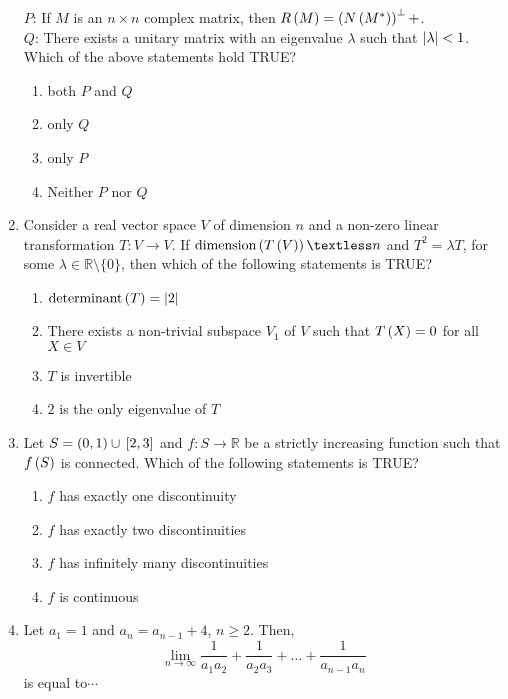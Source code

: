 \documentclass[journal,12pt,twocolumn]{IEEEtran}
\theoremstyle{remark}
\begin{document}
\begin{enumerate}[start=1]
         $P$: If $M$ is an $n \times n$ complex matrix, then $R\left(M\right) = \left(N\left(M^*\right)\right)^\perp+$.\\
        $Q$: There exists a unitary matrix with an eigenvalue $\lambda$ such that $\left\vert\lambda\right\vert < 1$.\\
    Which of the above statements hold TRUE?
    \begin{enumerate}
        \item both $P$ and $Q$
        \item only $Q$
        \item only $P$
        \item Neither $P$ nor $Q$
    \end{enumerate}

    \item Consider a real vector space $V$ of dimension $n$ and a non-zero linear transformation $T: V \to V$. If $\text{dimension}\brak{T\brak{V}} \textless n$ and $T^2 = \lambda T$, for some $\lambda \in \mathbb{R} \setminus \{0\}$, then which of the following statements is TRUE?
    \begin{enumerate}
        \item $\text{determinant}\left(T\right) = \left\vert2\right\vert$
        \item There exists a non-trivial subspace $V_1$ of $V$ such that $T\left(X\right) = 0$ for all $X \in V$
        \item $T$ is invertible
        \item $2$ is the only eigenvalue of $T$
    \end{enumerate}

    \item Let $S = \left(0,1\right) \cup {}\left[2,3\right]$ and $f: S \to \mathbb{R}$ be a strictly increasing function such that $f\left(S\right)$ is connected. Which of the following statements is TRUE?
    \begin{enumerate}
        \item $f$ has exactly one discontinuity
        \item $f$ has exactly two discontinuities
        \item $f$ has infinitely many discontinuities
        \item $f$ is continuous
    \end{enumerate}

    \item Let $a_1 = 1$ and $a_n = a_{n-1} + 4$, $n \geq 2$. Then,
    $$\lim_{n \to \infty} \frac{1}{a_1 a_2} + \frac{1}{a_2 a_3} + \dots + \frac{1}{a_{n-1} a_n}$$
    is equal to$\cdots$


\end{enumerate}
\end{document}

